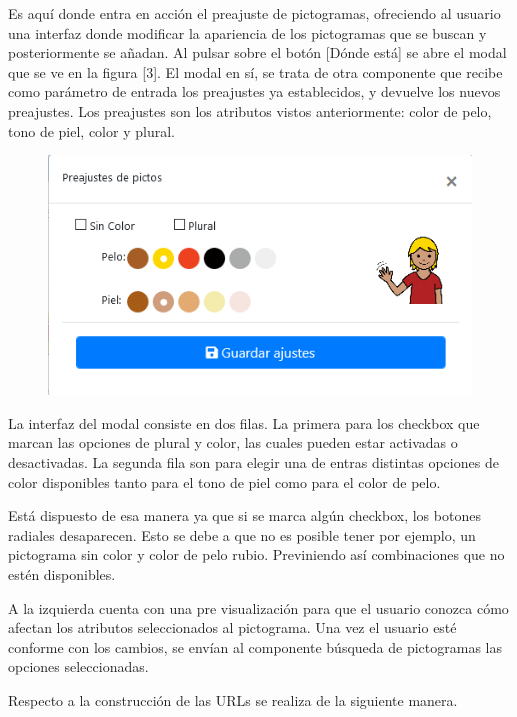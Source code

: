 Es aquí donde entra en acción el preajuste de pictogramas, ofreciendo al usuario una interfaz donde modificar la apariencia de los pictogramas que se buscan y posteriormente se añadan. Al pulsar sobre el botón [Dónde está] se abre el modal que se ve en la figura [3]. El modal en sí, se trata de otra componente que recibe como parámetro de entrada los preajustes ya establecidos, y devuelve los nuevos preajustes. Los preajustes son los atributos vistos anteriormente: color de pelo, tono de piel, color y plural. 

\begin{figure}[h!]
	\centering
	\includegraphics[width=0.7\linewidth]{Imagenes/Bitmap/modalPreajustePicto}
	\caption{}
	\label{fig:modalpreajustepicto}
\end{figure}



La interfaz del modal consiste en dos filas. La primera para los checkbox que marcan las opciones de plural y color, las cuales pueden estar activadas o desactivadas. La segunda fila son para elegir una de entras distintas opciones de color disponibles tanto para el tono de piel como para el color de pelo. 

Está dispuesto de esa manera ya que si se marca algún checkbox, los botones radiales desaparecen. Esto se debe a que no es posible tener por ejemplo, un pictograma sin color y color de pelo rubio. Previniendo así combinaciones que no estén disponibles. 

A la izquierda cuenta con una pre visualización para que el usuario conozca cómo afectan los atributos seleccionados al pictograma. Una vez el usuario esté conforme con los cambios, se envían al componente búsqueda de pictogramas las opciones seleccionadas. 

Respecto a la construcción de las URLs se realiza de la siguiente manera. 


